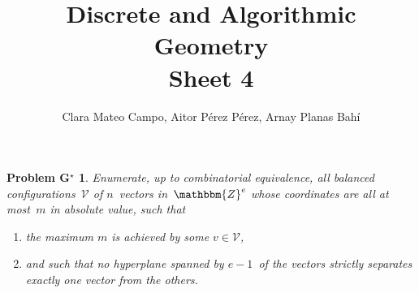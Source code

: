 \documentclass[10pt]{article}
\title{Discrete and Algorithmic Geometry \\Sheet 4}
\author{Clara Mateo Campo, Aitor P\'erez P\'erez, Arnay Planas Bah\'i}
\date{}
\newcommand{\Z}{\mathbbm{Z}}
\newcommand{\VV}{\mathcal{V}}
\newtheorem*{problemG*}{Problem G$^\star$}
\begin{document}
\maketitle

\begin{problemG*}
Enumerate, up to combinatorial equivalence, all balanced   configurations~$\VV$ of $n$~vectors in~$\Z^e$ whose coordinates are   all at most~$m$ in absolute value, such that
\begin{enumerate}
\item the maximum $m$ is achieved by some $v\in\VV$, 
\item and such that no hyperplane spanned by $e-1$~of the vectors   strictly separates exactly one vector from the others.
\end{enumerate}
\end{problemG*}
\end{document}
